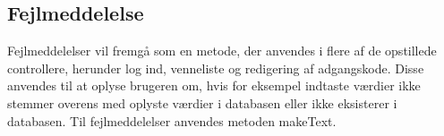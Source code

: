 \subsection*{Fejlmeddelelse}
Fejlmeddelelser vil fremgå som en metode, der anvendes i flere af de opstillede controllere, herunder log ind, venneliste og redigering af adgangskode. Disse anvendes til at oplyse brugeren om, hvis for eksempel indtaste værdier ikke stemmer overens med oplyste værdier i databasen eller ikke eksisterer i databasen. Til fejlmeddelelser anvendes metoden makeText.
